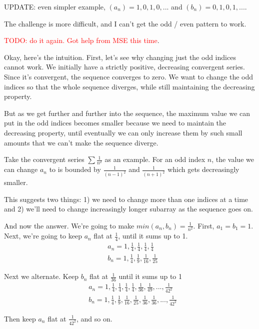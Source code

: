 \documentclass{oxmathproblems}
\begin{document}
\begin{questions}
\begin{solution}
  UPDATE: even simpler example, $(a_{n}) = 1, 0, 1, 0, ...$ and $(b_{n}) = 0, 1, 0, 1, ...$.

  The challenge is more difficult, and I can't get the odd / even pattern to work.

  \textcolor{red}{TODO: do it again. Got help from MSE this time}.

  Okay, here's the intuition. First, let's see why changing just the odd indices cannot work. We initially have a strictly positive, decreasing convergent series. Since it's convergent,
  the sequence converges to zero. We want to change the odd indices so that the whole sequence diverges, while still maintaining the decreasing property.

  But as we get further and further into the sequence, the maximum value we can put in the odd indices becomes smaller because we need to maintain the decreasing property, until eventually
  we can only increase them by such small amounts that we can't make the sequence diverge.

  Take the convergent series $\sum \frac{1}{n^2}$ as an example. For an odd index $n$, the value we can change $a_{n}$ to is bounded by $\frac{1}{(n-1)^2}$ and $\frac{1}{(n+1)^2}$ which gets
  decreasingly smaller.

  This suggests two things: 1) we need to change more than one indices at a time and 2) we'll need to change increasingly longer subarray as the sequence goes on.

  And now the answer. We're going to make $min(a_{n}, b_{n}) = \frac{1}{n^2}$. First, $a_{1} = b_{1} = 1$. Next, we're going to keep $a_{n}$ flat at $\frac{1}{4}$,
  until it sums up to 1.
  \begin{align*}
    &a_{n} = 1, \frac{1}{4}, \frac{1}{4}, \frac{1}{4}, \frac{1}{4} \\
    &b_{n} = 1, \frac{1}{4}, \frac{1}{9}, \frac{1}{16}, \frac{1}{25}
  \end{align*}

  Next we alternate. Keep $b_{n}$ flat at $\frac{1}{36}$ until it sums up to 1
  \begin{align*}
    &a_{n} = 1, \frac{1}{4}, \frac{1}{4}, \frac{1}{4}, \frac{1}{4}, \frac{1}{36}, \frac{1}{49}, ... , \frac{1}{42^2}\\
    &b_{n} = 1, \frac{1}{4}, \frac{1}{9}, \frac{1}{16}, \frac{1}{25}, \frac{1}{36}, \frac{1}{36}, ..., \frac{1}{42^2}
  \end{align*}

  Then keep $a_{n}$ flat at $\frac{1}{42^2}$, and so on.
\end{solution}


\end{questions}
\end{document}
